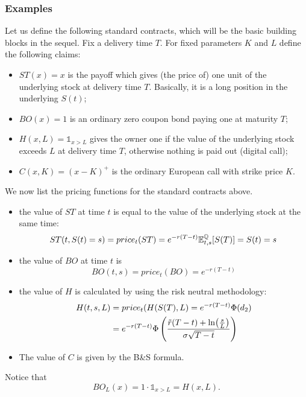 \subsubsection{Examples}
Let us define the following standard contracts, which will be the basic building blocks in the sequel. Fix a delivery time $T$. For fixed parameters $K$ and $L$ define the following claims:
\begin{itemize}
    \item $ST(x) = x$ is the payoff which gives (the price of) one unit of the underlying stock at delivery time $T$. Basically, it is a long position in the underlying $S(t)$;
    \item $BO(x) = 1$ is an ordinary zero coupon bond paying one at maturity $T$;
    \item $H(x,L) = \mathds{1}_{x>L}$ gives the owner one if the value of the underlying stock exceeds $L$ at delivery time $T$, otherwise nothing is paid out (digital call);
    \item $C(x,K) = (x-K)^+$ is the ordinary European call with strike price $K$.
\end{itemize}
We now list the pricing functions for the standard contracts above.
\begin{itemize}
    \item the value of $ST$ at time $t$ is equal to the value of the
    underlying stock at the same time:
    \begin{equation}
        ST(t,S(t)=s) = price_t(ST) = e^{-r(T-t)}\mathbb{E}^{\mathbb{Q}}_{t,s}[S(T)] = S(t) = s
    \end{equation}
    \item the value of $BO$ at time $t$ is
    \begin{equation}
        BO(t,s) = price_t(BO) = e^{-r(T-t)}
    \end{equation}
    \item the value of $H$ is calculated by using the risk neutral methodology:
    \begin{align}
        \notag H(t,s,L) &= price_t(H(S(T),L) = e^{-r(T-t)}\Phi(d_2) \\
        &=
        e^{-r(T-t)}\Phi\left(\frac{\Tilde{r}(T-t) + \ln(\tfrac{s}{L})}{\sigma\sqrt{T-t}}\right)
    \end{align}
    \item The value of $C$ is given by the B\&S formula.
\end{itemize}
Notice that
$$BO_L(x) = 1\cdot\mathds{1}_{x>L} = H(x,L).$$
